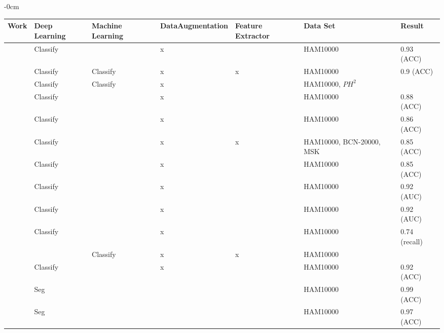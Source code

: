 \documentclass[sensors,article,accept,pdftex,moreauthors]{Definitions/mdpi}
\begin{document}
{\begin{table}[H]
\begin{adjustwidth}{-\extralength}{0cm}
\centering
\begin{tabular}{ c  p{1.8cm}  p{1.8cm}  p{2.55cm}  p{1.5cm}  p{5cm}  p{2cm} }
	\toprule
	\textbf{Work} & \textbf{Deep Learning} & \textbf{Machine Learning} & \textbf{Data\linebreak Augmentation} & \textbf{Feature Extractor} & \textbf{Data Set} & \textbf{Result}\\
	\midrule
	\cite{03358} & Classify & & x & & HAM10000 & 0.93 (ACC)\\
	\midrule
	\cite{03798} & Classify & Classify & x & x & HAM10000 & 0.9 (ACC)\\
	\midrule
	\cite{10348} & Classify & Classify & x & & HAM10000, $PH^2$ & \\
	\midrule
	\cite{09418} & Classify & & x & & HAM10000 & 0.88 (ACC)\\
	\midrule
	\cite{01284} & Classify & & x & & HAM10000 & 0.86 (ACC)\\
	\midrule
	\cite{06612} & Classify & & x & x & HAM10000, BCN-20000, MSK & 0.85 (ACC)\\
	\midrule
	\cite{03225} & Classify & & x & & HAM10000 & 0.85 (ACC)\\
	\midrule
	\cite{12602} & Classify & & x & & HAM10000 & 0.92 (AUC)\\
	\midrule
	\cite{03426} & Classify & & x & & HAM10000 & 0.92 (AUC)\\
	\midrule
	\cite{03910} & Classify & & x & & HAM10000 & 0.74 (recall)\\
	\midrule
	\cite{05045} & & Classify & x & x & HAM10000 & \\
	\midrule
	\cite{2101.133} & Classify&  & x &  & HAM10000 & 0.92 (ACC)\\
	\midrule
	\cite{22750} & Seg&  &  &  & HAM10000 & 0.99 (ACC)\\
	\midrule
	\cite{9445180} & Seg &  &  &  & HAM10000 & 0.97 (ACC)\\
	\bottomrule
\end{tabular}
\end{adjustwidth}
		\end{table}
}
\end{document}
